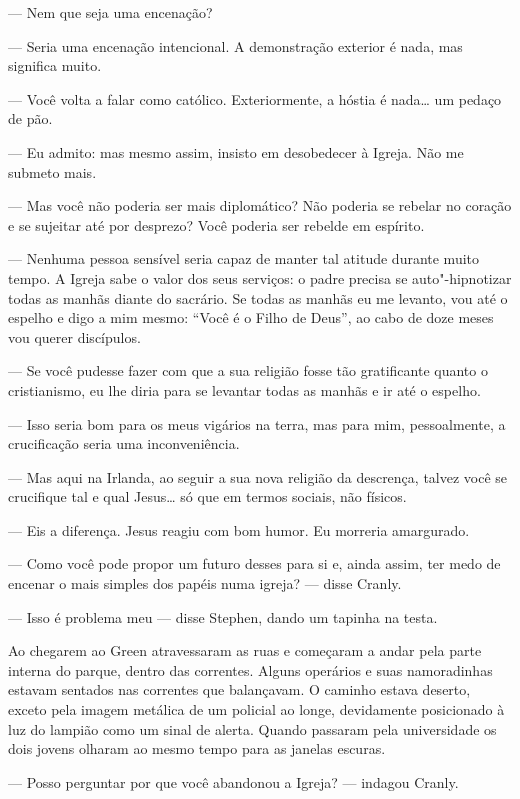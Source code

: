 --- Nem que seja uma encenação?

--- Seria uma encenação intencional.  A demonstração exterior é nada, mas
significa muito.

--- Você volta a falar como católico.  Exteriormente, a hóstia é nada\ldots{} um
pedaço de pão.

--- Eu admito: mas mesmo assim, insisto em desobedecer à Igreja.  Não me
submeto mais.

--- Mas você não poderia ser mais diplomático?  Não poderia se rebelar no
coração e se sujeitar até por desprezo?  Você poderia ser rebelde em espírito.

--- Nenhuma pessoa sensível seria capaz de manter tal atitude durante muito
tempo.  A Igreja sabe o valor dos seus serviços: o padre precisa se
auto"-hipnotizar todas as manhãs diante do sacrário.  Se todas as manhãs eu me
levanto, vou até o espelho e digo a mim mesmo: “Você é o Filho de Deus”, ao
cabo de doze meses vou querer discípulos.

--- Se você pudesse fazer com que a sua religião fosse tão gratificante quanto
o cristianismo, eu lhe diria para se levantar todas as manhãs e ir até o
espelho.

--- Isso seria bom para os meus vigários na terra, mas para mim, pessoalmente,
a crucificação seria uma inconveniência.

--- Mas aqui na Irlanda, ao seguir a sua nova religião da descrença, talvez
você se crucifique tal e qual Jesus\ldots{} só que em termos sociais, não físicos.

--- Eis a diferença.  Jesus reagiu com bom humor.  Eu morreria amargurado.

--- Como você pode propor um futuro desses para si e, ainda assim, ter medo de
encenar o mais simples dos papéis numa igreja? --- disse Cranly.

--- Isso é problema meu --- disse Stephen, dando um tapinha na testa.

Ao chegarem ao Green atravessaram as ruas e começaram a andar pela parte
interna do parque, dentro das correntes.  Alguns operários e suas namoradinhas
estavam sentados nas correntes que balançavam.  O caminho estava deserto,
exceto pela imagem metálica de um policial ao longe, devidamente posicionado à
luz do lampião como um sinal de alerta.  Quando passaram pela universidade os
dois jovens olharam ao mesmo tempo para as janelas escuras.

--- Posso perguntar por que você abandonou a Igreja? --- indagou Cranly.

